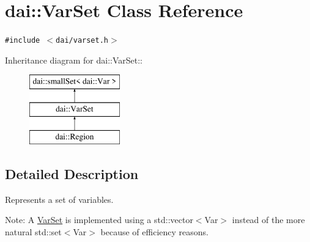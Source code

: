 \hypertarget{classdai_1_1VarSet}{
\section{dai::VarSet Class Reference}
\label{classdai_1_1VarSet}
}
{\tt \#include $<$dai/varset.h$>$}

Inheritance diagram for dai::VarSet::\begin{figure}[H]
\begin{center}
\leavevmode
\includegraphics[height=3cm]{classdai_1_1VarSet}
\end{center}
\end{figure}


\subsection{Detailed Description}
Represents a set of variables. 

\begin{Desc}
\item[Note:]A \hyperlink{classdai_1_1VarSet}{VarSet} is implemented using a std::vector$<$Var$>$ instead of the more natural std::set$<$Var$>$ because of efficiency reasons. \end{Desc}
